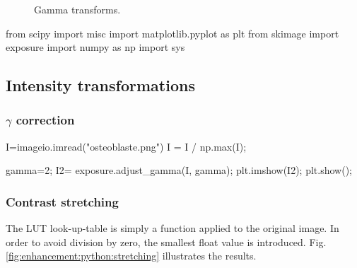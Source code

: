 \def\QRCODE{TB_image_TUT.IMG.image_enhancement_pythonqrcode.png}
\def\QRPAGE{http://www.iptutorials.science/tree/master/TB_image/TUT.IMG.image_enhancement/python}


\begin{figure}[H]
 \centering\caption{Gamma transforms.}%
 \hfill
 
  \hfill
 \vspace*{-5pt}%
 \label{fig:enhancement:python:gamma}%
\end{figure}

\begin{python}
from scipy import misc
import matplotlib.pyplot as plt
from skimage import exposure
import numpy as np
import sys
\end{python}

\vspace*{-0.3cm}

\subsection{Intensity transformations}

\vspace*{-0.2cm}

\subsubsection{$\gamma$ correction}
\begin{python}
I=imageio.imread("osteoblaste.png")
I = I / np.max(I);

gamma=2;
I2= exposure.adjust_gamma(I, gamma);
plt.imshow(I2);
plt.show();
\end{python}

\subsubsection{Contrast stretching}
The LUT look-up-table is simply a function applied to the original image. In order to avoid division by zero, the smallest float value is introduced. Fig.\ref{fig:enhancement:python:stretching} illustrates the results.

